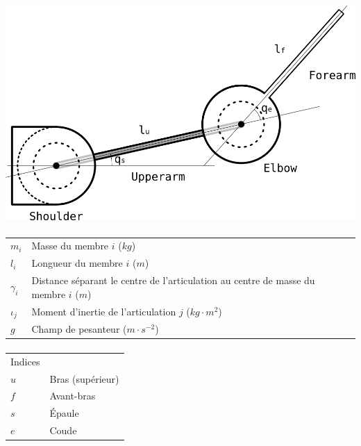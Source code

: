 \documentclass[pdftex,a4paper,11pt]{article}
\numberwithin{equation}{subsection}
\begin{document}
\begin{center}
        \includegraphics[width=.80\linewidth]{fig/arm}
\end{center}

\paragraph{}
\begin{tabular}{ll}
    $m_i$      & Masse du membre $i$ ($kg$) \\
    $l_i$      & Longueur du membre $i$ ($m$) \\
    $\gamma_i$ & Distance séparant le centre de l'articulation au centre de masse du membre $i$ ($m$) \\
    $\iota_j$  & Moment d'inertie de l'articulation $j$ ($kg \cdot m^2$) \\
    $g$        & Champ de pesanteur ($m \cdot s^{-2}$) \\
\end{tabular}

\paragraph{}
\begin{tabular}{ll}
    Indices & \\
    $u$ & Bras (supérieur)\\
    $f$ & Avant-bras\\
    $s$ & Épaule\\
    $e$ & Coude\\
\end{tabular}
\end{document}

